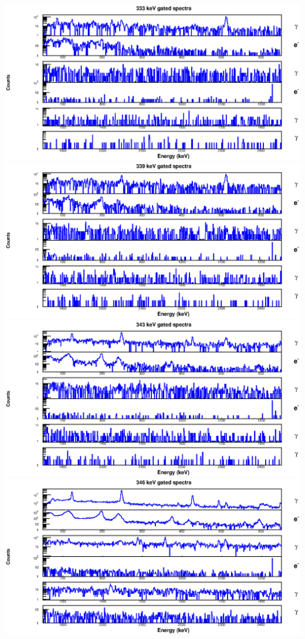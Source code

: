 \begin{landscape}
\includegraphics[scale=1.2]{154Gd_Appendix/333_combined.eps}
\includegraphics[scale=1.2]{154Gd_Appendix/339_combined.eps}
\includegraphics[scale=1.2]{154Gd_Appendix/343_combined.eps}
\includegraphics[scale=1.2]{154Gd_Appendix/346_combined.eps}

\end{landscape}
